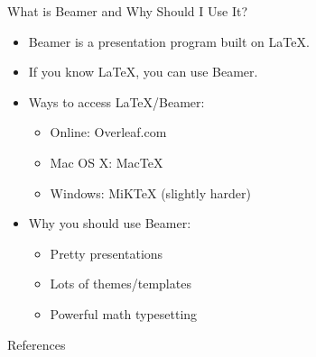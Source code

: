 






\begin{frame}
    \titlepage
\end{frame}



\begin{frame}{What is Beamer and Why Should I Use It?}
	\begin{block}{}
		\begin{itemize}[<+->]
		\item Beamer is a presentation program built on \LaTeX.
		\item If you know \LaTeX, you can use Beamer.
		\item Ways to access \LaTeX/Beamer:
		\begin{itemize}
			\item Online: Overleaf.com
			\item Mac OS X: MacTeX
			\item Windows: MiKTeX (slightly harder)
		\end{itemize}
		\item Why you should use Beamer:
		\begin{itemize}
			\item Pretty presentations
			\item Lots of themes/templates
			\item Powerful math typesetting
		\end{itemize}
	\end{itemize}
\end{block}
\end{frame}



\begin{frame}{References}
	\nocite{wagner}
	
\end{frame}





